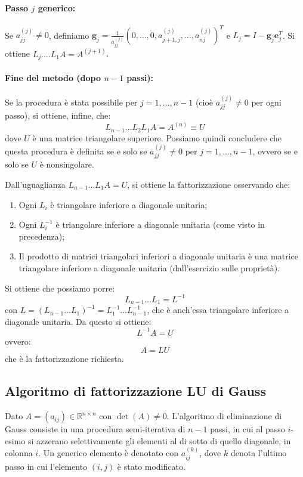 \paragraph{Passo $j$ generico:}
Se $a_{jj}^{(j)} \neq 0$, definiamo $\mathbf{g}_j = \frac{1}{a_{jj}^{(j)}} (0, \dots, 0, a_{j+1,j}^{(j)}, \dots, a_{nj}^{(j)})^T$ e $L_j = I - \mathbf{g}_j \mathbf{e}_j^T$.
Si ottiene $L_j....L_1A = A^{(j+1)}$.

\paragraph{Fine del metodo (dopo $n-1$ passi):}
Se la procedura è stata possibile per $j=1, \dots, n-1$ (cioè $a_{jj}^{(j)} \neq 0$ per ogni passo), si ottiene, infine, che:
$$ L_{n-1} \dots L_2 L_1 A = A^{(n)} \equiv U $$
dove $U$ è una matrice triangolare superiore.
Possiamo quindi concludere che questa procedura è definita se e solo se $a_{jj}^{(j)} \neq 0$ per $j=1, \dots, n-1$, ovvero se e solo se $U$ è nonsingolare.

Dall'uguaglianza $L_{n-1} \dots L_1 A = U$, si ottiene la fattorizzazione osservando che:
\begin{enumerate}
    \item Ogni $L_i$ è triangolare inferiore a diagonale unitaria;
    \item Ogni $L_i^{-1}$ è triangolare inferiore a diagonale unitaria (come visto in precedenza);
    \item Il prodotto di matrici triangolari inferiori a diagonale unitaria è una matrice triangolare inferiore a diagonale unitaria (dall'esercizio sulle proprietà).
\end{enumerate}
Si ottiene che possiamo porre:
$$ L_{n-1} \dots L_1 = L^{-1} $$
con $L = (L_{n-1} \dots L_1)^{-1} = L_1^{-1} \dots L_{n-1}^{-1}$, che è anch'essa triangolare inferiore a diagonale unitaria.
Da questo si ottiene:
$$ L^{-1} A = U $$
ovvero:
$$ A = L U $$
che è la fattorizzazione richiesta.



\subsection{Algoritmo di fattorizzazione LU di Gauss}
Dato $A=(a_{ij}) \in \mathbb{R}^{n \times n}$ con $\det(A) \neq 0$.
L'algoritmo di eliminazione di Gauss consiste in una procedura semi-iterativa di $n-1$ passi, in cui al passo $i$-esimo si azzerano selettivamente gli elementi al di sotto di quello diagonale, in colonna $i$.
Un generico elemento è denotato con $a_{ij}^{(k)}$, dove $k$ denota l'ultimo passo in cui l'elemento $(i,j)$ è stato modificato.

